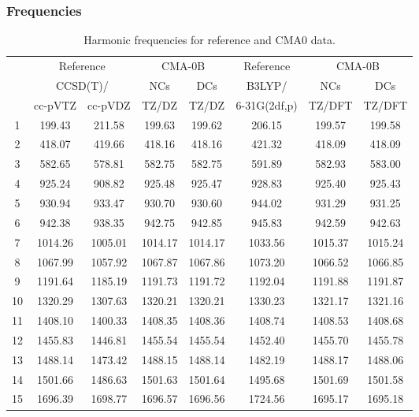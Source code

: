 \documentclass[10pt,oneside]{article}
\begin{document}
\subsubsection*{Frequencies}
\begin{table}[h!]
\centering
\caption{Harmonic frequencies for reference and CMA0 data.}
\begin{tabular}{cccccccc}
\toprule
{} & \multicolumn{2}{c}{Reference} & \multicolumn{2}{c}{CMA-0B} &    Reference & \multicolumn{2}{c}{CMA-0B} \\
{} & \multicolumn{2}{c}{CCSD(T)/} &     NCs &     DCs &       B3LYP/ &     NCs &     DCs \\
{} &   cc-pVTZ & cc-pVDZ &   TZ/DZ &   TZ/DZ & 6-31G(2df,p) &  TZ/DFT &  TZ/DFT \\
\midrule
1  &    199.43 &  211.58 &  199.63 &  199.62 &       206.15 &  199.57 &  199.58 \\
2  &    418.07 &  419.66 &  418.16 &  418.16 &       421.32 &  418.09 &  418.09 \\
3  &    582.65 &  578.81 &  582.75 &  582.75 &       591.89 &  582.93 &  583.00 \\
4  &    925.24 &  908.82 &  925.48 &  925.47 &       928.83 &  925.40 &  925.43 \\
5  &    930.94 &  933.47 &  930.70 &  930.60 &       944.02 &  931.29 &  931.25 \\
6  &    942.38 &  938.35 &  942.75 &  942.85 &       945.83 &  942.59 &  942.63 \\
7  &   1014.26 & 1005.01 & 1014.17 & 1014.17 &      1033.56 & 1015.37 & 1015.24 \\
8  &   1067.99 & 1057.92 & 1067.87 & 1067.86 &      1073.20 & 1066.52 & 1066.85 \\
9  &   1191.64 & 1185.19 & 1191.73 & 1191.72 &      1192.04 & 1191.88 & 1191.87 \\
10 &   1320.29 & 1307.63 & 1320.21 & 1320.21 &      1330.23 & 1321.17 & 1321.16 \\
11 &   1408.10 & 1400.33 & 1408.35 & 1408.36 &      1408.74 & 1408.53 & 1408.68 \\
12 &   1455.83 & 1446.81 & 1455.54 & 1455.54 &      1452.40 & 1455.70 & 1455.78 \\
13 &   1488.14 & 1473.42 & 1488.15 & 1488.14 &      1482.19 & 1488.17 & 1488.06 \\
14 &   1501.66 & 1486.63 & 1501.63 & 1501.64 &      1495.68 & 1501.69 & 1501.58 \\
15 &   1696.39 & 1698.77 & 1696.57 & 1696.56 &      1724.56 & 1695.17 & 1695.18 \\

\end{tabular}
\end{table}
\end{document}
